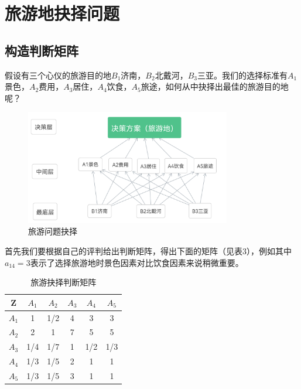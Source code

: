 \documentclass{ctexart}
\begin{document}
\section{旅游地抉择问题}
\subsection{构造判断矩阵}
\setlength{\parindent}{2em}假设有三个心仪的旅游目的地$B_{1}$济南，$B_{2}$北戴河，$B_{3}$三亚。我们的选择标准有$A_{1}$景色，$A_{2}$费用，$A_{3}$居住，$A_{4}$饮食，$A_{5}$旅途，如何从中抉择出最佳的旅游目的地呢？

\begin{figure}[h!]
\centering
\includegraphics[width=0.8\textwidth]{002.png}
\caption{旅游问题抉择}
\end{figure}


\setlength{\parindent}{2em}首先我们要根据自己的评判给出判断矩阵，得出下面的矩阵（见表3），例如其中$a_{14}=3$表示了选择旅游地时景色因素对比饮食因素来说稍微重要。\\

\begin{table}[h!]
\centering
\begin{center}
 \begin{tabular}{|c|c|c|c|c|c|} 
 \hline
 Z & $A_{1}$ & $A_{2}$ & $A_{3}$ & $A_{4}$& $A_{5}$ \\
 \hline
 $A_{1}$ & 1 & 1/2 & 4 & 3 & 3 \\
 \hline
  $A_{2}$ & 2 & 1 & 7 & 5 & 5 \\
 \hline
  $A_{3}$ & 1/4 & 1/7 & 1 & 1/2 & 1/3 \\
 \hline
  $A_{4}$ & 1/3 & 1/5 & 2 & 1 & 1 \\
 \hline
  $A_{5}$ & 1/3 & 1/5 & 3 & 1 & 1 \\
 \hline
\end{tabular}
\end{center}
\caption{旅游抉择判断矩阵}
\label{表:3}
\end{table}
\end{document}
